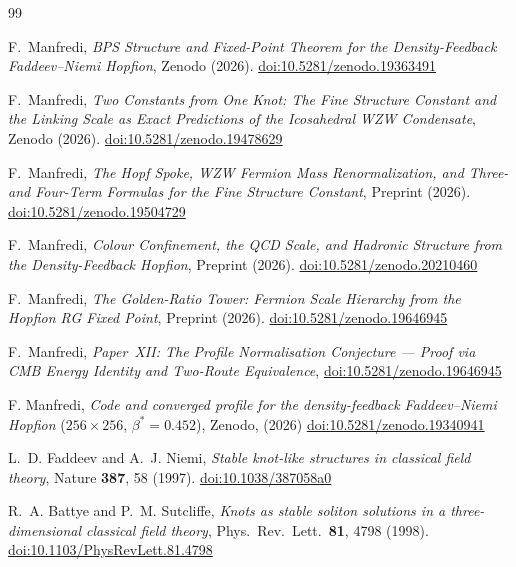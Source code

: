 \documentclass[11pt,a4paper]{article}
\theoremstyle{definition}
\theoremstyle{remark}
\begin{document}
\begin{thebibliography}{99}

F.~Manfredi,
\textit{BPS Structure and Fixed-Point Theorem for the
  Density-Feedback Faddeev--Niemi Hopfion},
Zenodo (2026).
\href{https://doi.org/10.5281/zenodo.19363491}{doi:10.5281/zenodo.19363491}

F.~Manfredi,
\textit{Two Constants from One Knot: The Fine Structure Constant and
  the Linking Scale as Exact Predictions of the Icosahedral WZW Condensate},
Zenodo (2026).
\href{https://doi.org/10.5281/zenodo.19478629}{doi:10.5281/zenodo.19478629}

F.~Manfredi,
\textit{The Hopf Spoke, WZW Fermion Mass Renormalization,
  and Three- and Four-Term Formulas for the Fine Structure Constant},
Preprint (2026).
\href{https://doi.org/10.5281/zenodo.19504729}{doi:10.5281/zenodo.19504729}

F.~Manfredi,
\textit{Colour Confinement, the QCD Scale, and Hadronic Structure
  from the Density-Feedback Hopfion},
Preprint (2026).
\href{https://doi.org/10.5281/zenodo.20210460}{doi:10.5281/zenodo.20210460}

F.~Manfredi,
\textit{The Golden-Ratio Tower: Fermion Scale Hierarchy from the Hopfion RG Fixed Point},
Preprint (2026).
\href{https://doi.org/10.5281/zenodo.19646945}{doi:10.5281/zenodo.19646945}

F.~Manfredi,
\textit{Paper~XII: The Profile Normalisation Conjecture --- Proof via CMB Energy Identity and Two-Route Equivalence},
\href{https://doi.org/10.5281/zenodo.19646945}{doi:10.5281/zenodo.19646945}

F. Manfredi,
\textit{Code and converged profile for the density-feedback
  Faddeev--Niemi Hopfion} ($256\times256$, $\beta^*=0.452$),
Zenodo, (2026) \href{https://doi.org/10.5281/zenodo.19340941}{doi:10.5281/zenodo.19340941}

L.~D. Faddeev and A.~J. Niemi,
\textit{Stable knot-like structures in classical field theory},
Nature \textbf{387}, 58 (1997).
\href{https://doi.org/10.1038/387058a0}{doi:10.1038/387058a0}

R.~A. Battye and P.~M. Sutcliffe,
\textit{Knots as stable soliton solutions in a three-dimensional classical
field theory},
Phys.\ Rev.\ Lett.\ \textbf{81}, 4798 (1998).
\href{https://doi.org/10.1103/PhysRevLett.81.4798}{doi:10.1103/PhysRevLett.81.4798}


\end{thebibliography}
\end{document}
